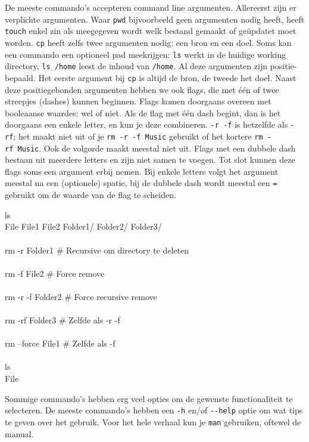 De meeste commando's accepteren command line argumenten. Allereerst zijn er verplichte argumenten. Waar \texttt{pwd} bijvoorbeeld geen argumenten nodig heeft, heeft \texttt{touch} enkel zin als meegegeven wordt welk bestand gemaakt of geüpdatet moet worden. \texttt{cp} heeft zelfs twee argumenten nodig: een bron en een doel. Soms kan een commando een optioneel pad meekrijgen: \texttt{ls} werkt in de huidige working directory, \texttt{ls\ /home} leest de inhoud van \texttt{/home}. Al deze argumenten zijn positie-bepaald. Het eerste argument bij \texttt{cp} is altijd de bron, de tweede het doel. Naast deze positiegebonden argumenten hebben we ook flags, die met één of twee streepjes (dashes) kunnen beginnen. Flags komen doorgaans overeen met booleaanse waardes: wel of niet. Als de flag met één dash begint, dan is het doorgaans een enkele letter, en kun je deze combineren. \texttt{-r\ -f} is hetzelfde als \texttt{-rf}; het maakt niet uit of je \texttt{rm\ -r\ -f\ Music} gebruikt of het kortere \texttt{rm\ -rf\ Music}. Ook de volgorde maakt meestal niet uit. Flags met een dubbele dash bestaan uit meerdere letters en zijn niet samen te voegen. Tot slot kunnen deze flags soms een argument erbij nemen. Bij enkele letters volgt het argument meestal na een (optionele) spatie, bij de dubbele dash wordt meestal een \texttt{=} gebruikt om de waarde van de flag te scheiden.

\begin{bash}
\p[~/Folder] ls\\
File  File1  File2  Folder1/  Folder2/ Folder3/\\
\\
\p[~/Folder] rm -r Folder1    \# Recursive om directory te deleten\\
\\
\p[~/Folder] rm -f File2      \# Force remove\\
\\
\p[~/Folder] rm -r -f Folder2 \# Force recursive remove\\
\\
\p[~/Folder] rm -rf Folder3   \# Zelfde als -r -f\\
\\
\p[~/Folder] rm --force File1 \# Zelfde als -f\\
\\
\p[~/Folder] ls\\
File\\
\end{bash}

Sommige commando's hebben erg veel opties om de gewenste functionaliteit te selecteren. De meeste commando's hebben een \texttt{-h} en/of \texttt{-\/-help} optie om wat tips te geven over het gebruik. Voor het hele verhaal kun je \texttt{man} gebruiken, oftewel de manual.

